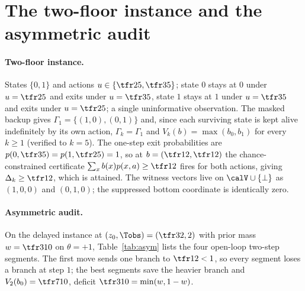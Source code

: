 \section{The two-floor instance and the asymmetric audit}\label{si:instances}

\paragraph{Two-floor instance.} States $\{0,1\}$ and actions $u\in\{\tfr25,\tfr35\}$; state $0$ stays at $0$ under $u=\tfr25$ and exits under $u=\tfr35$, state $1$ stays at $1$ under $u=\tfr35$ and exits under $u=\tfr25$; a single uninformative observation. The masked backup gives $\Gamma_1=\{(1,0),(0,1)\}$ and, since each surviving state is kept alive indefinitely by its own action, $\Gamma_k=\Gamma_1$ and $V_k(b)=\max(b_0,b_1)$ for every $k\ge1$ (verified to $k=5$). The one-step exit probabilities are $p(0,\tfr35)=p(1,\tfr25)=1$, so at $b=(\tfr12,\tfr12)$ the chance-constrained certificate $\sum_xb(x)p(x,a)\ge\tfr12$ fires for both actions, giving $\Delta_k\ge\tfr12$, which is attained. The witness vectors live on $\calV\cup\{\bot\}$ as $(1,0,0)$ and $(0,1,0)$; the suppressed bottom coordinate is identically zero.

\paragraph{Asymmetric audit.} On the delayed instance at $(z_0,\Tobs)=(\tfr32,2)$ with prior mass $w=\tfr3{10}$ on $\theta=+1$, Table~\ref{tab:asym} lists the four open-loop two-step segments. The first move sends one branch to $\tfr12<1$, so every segment loses a branch at step $1$; the best segments save the heavier branch and $V_2(b_0)=\tfr7{10}$, deficit $\tfr3{10}=\min(w,1-w)$.

\begin{table}[h]
\centering\footnotesize
\caption{The asymmetric audit at $(z_0,\Tobs)=(\tfr32,2)$, $b_0=(w,1-w)=(\tfr3{10},\tfr7{10})$.}
\label{tab:asym}

\end{table}
